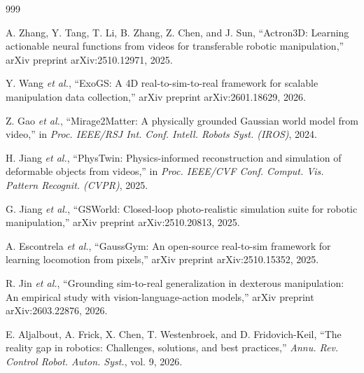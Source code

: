 \documentclass[12pt,a4paper,oneside]{report}
\begin{document}
\begin{thebibliography}{999}

A. Zhang, Y. Tang, T. Li, B. Zhang, Z. Chen, and J. Sun, ``{Actron3D}: Learning actionable neural functions from videos for transferable robotic manipulation,'' arXiv preprint arXiv:2510.12971, 2025.




Y. Wang \textit{et al.}, ``{ExoGS}: A {4D} real-to-sim-to-real framework for scalable manipulation data collection,'' arXiv preprint arXiv:2601.18629, 2026.




Z. Gao \textit{et al.}, ``Mirage2Matter: A physically grounded Gaussian world model from video,'' in \textit{Proc. IEEE/RSJ Int. Conf. Intell. Robots Syst. (IROS)}, 2024.




H. Jiang \textit{et al.}, ``PhysTwin: Physics-informed reconstruction and simulation of deformable objects from videos,'' in \textit{Proc. IEEE/CVF Conf. Comput. Vis. Pattern Recognit. (CVPR)}, 2025.




G. Jiang \textit{et al.}, ``{GSWorld}: Closed-loop photo-realistic simulation suite for robotic manipulation,'' arXiv preprint arXiv:2510.20813, 2025.




A. Escontrela \textit{et al.}, ``{GaussGym}: An open-source real-to-sim framework for learning locomotion from pixels,'' arXiv preprint arXiv:2510.15352, 2025.




R. Jin \textit{et al.}, ``Grounding sim-to-real generalization in dexterous manipulation: An empirical study with vision-language-action models,'' arXiv preprint arXiv:2603.22876, 2026.





E. Aljalbout, A. Frick, X. Chen, T. Westenbroek, and D. Fridovich-Keil, ``The reality gap in robotics: Challenges, solutions, and best practices,'' \textit{Annu. Rev. Control Robot. Auton. Syst.}, vol. 9, 2026.




\end{thebibliography}
\end{document}
